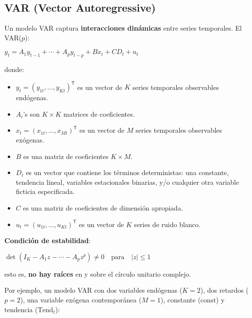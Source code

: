 \documentclass[10pt, a4paper, landscape]{article}
\newcommand{\tr}{\mathsf{T}}
\begin{document}
	\begin{multicols}{2}
		\section*{VAR (Vector Autoregressive)}
		
		Un modelo VAR captura \textbf{interacciones dinámicas} entre series temporales. El VAR($p$):
		
		\begin{center}
			$y_{t} = A_{1} y_{t - 1}+ \cdots + A_{p} y_{t - p} + B x_{t} + CD_{t} + u_{t}$
		\end{center}
		
		donde:
		
		\begin{itemize}[leftmargin=*]
			\item $y_{t} = (y_{1t}, \ldots, y_{Kt})^{\tr}$ es un vector de $K$ series temporales observables endógenas.
			\item $A_{i}$'s son $K \times K$ matrices de coeficientes.
			\item $x_{t} = (x_{1t}, \ldots, x_{Mt})^{\tr}$ es un vector de $M$ series temporales observables exógenas.
			\item $B$ es una matriz de coeficientes $K \times M$.
			\item $D_{t}$ es un vector que contiene los términos deterministas: una constante, tendencia lineal, variables estacionales binarias, y/o cualquier otra variable ficticia especificada.
			\item $C$ es una matriz de coeficientes de dimensión apropiada.
			\item $u_{t} = (u_{1t}, \ldots, u_{Kt})^{\tr}$ es un vector de $K$ series de ruido blanco.
		\end{itemize}
		
		\textbf{Condición de estabilidad}:
		
		\begin{center}
			$\det(I_{K} - A_{1} z - \cdots - A_{p} z^{p}) \neq 0 \quad \mathrm{para}\quad \lvert z \rvert \leq 1$
		\end{center}
		
		\quad esto es, \textbf{no hay raíces} en y sobre el círculo unitario complejo.
		
		Por ejemplo, un modelo VAR con dos variables endógenas ($K = 2$), dos retardos ($p = 2$), una variable exógena contemporánea ($M = 1$), constante ($\mathrm{const}$) y tendencia ($\mathrm{Tend}_{t}$):
		

\end{multicols}
\end{document}
